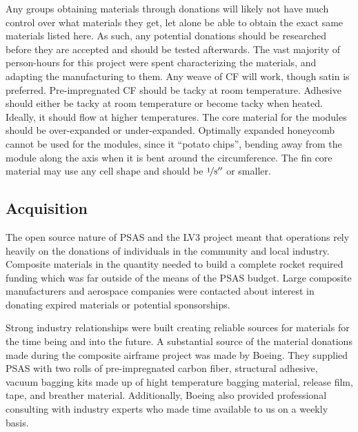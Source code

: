 \documentclass{aiaa-tc}%
\begin{document}
Any groups obtaining materials through donations will likely not have much control over what materials they get, let alone be able to obtain the exact same materials listed here.
As such, any potential donations should be researched before they are accepted and should be tested afterwards. 
The vast majority of person-hours for this project were spent characterizing the materials, and adapting the manufacturing to them.
Any weave of CF will work, though satin is preferred. Pre-impregnated CF should be tacky at room temperature.
Adhesive should either be tacky at room temperature or become tacky when heated. Ideally, it should flow at higher temperatures. 
The core material for the modules should be over-expanded or under-expanded. 
Optimally expanded honeycomb cannot be used for the modules, since it ``potato chips'', bending away from the module along the axis when it is bent around the circumference. 
The fin core material may use any cell shape and should be $\nicefrac{1}{8}''$ or smaller. 

\subsection{Acquisition}
The open source nature of PSAS and the LV3 project meant that operations rely heavily on the donations of individuals in the community and local industry. Composite materials in the quantity needed to build a complete rocket required funding which was far outside of the means of the PSAS budget. Large composite manufacturers and aerospace companies were contacted about interest in donating expired materials or potential sponsorships. 

Strong industry relationships were built creating reliable sources for materials for the time being and into the future. A substantial source of the material donations made during the composite airframe project was made by Boeing. They supplied PSAS with two rolls of pre-impregnated carbon fiber, structural adhesive, vacuum bagging kits made up of hight temperature bagging material, release film, tape, and breather material. Additionally, Boeing also provided professional consulting with industry experts who made time available to us on a weekly basis. 
\end{document}
